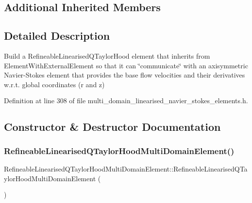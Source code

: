 \subsection*{Additional Inherited Members}


\subsection{Detailed Description}
Build a Refineable\+Linearised\+Q\+Taylor\+Hood element that inherits from Element\+With\+External\+Element so that it can \char`\"{}communicate\char`\"{} with an axisymmetric Navier-\/\+Stokes element that provides the base flow velocities and their derivatives w.\+r.\+t. global coordinates (r and z) 

Definition at line 308 of file multi\+\_\+domain\+\_\+linearised\+\_\+navier\+\_\+stokes\+\_\+elements.\+h.



\subsection{Constructor \& Destructor Documentation}
\mbox{\label{classRefineableLinearisedQTaylorHoodMultiDomainElement_a7871dc5c779ab057bdcbc22bf541ff3d}} 
\subsubsection{\texorpdfstring{Refineable\+Linearised\+Q\+Taylor\+Hood\+Multi\+Domain\+Element()}{RefineableLinearisedQTaylorHoodMultiDomainElement()}}
{\footnotesize\ttfamily Refineable\+Linearised\+Q\+Taylor\+Hood\+Multi\+Domain\+Element\+::\+Refineable\+Linearised\+Q\+Taylor\+Hood\+Multi\+Domain\+Element (\begin{DoxyParamCaption}{ }\end{DoxyParamCaption})\hspace{0.3cm}{\ttfamily [inline]}}



